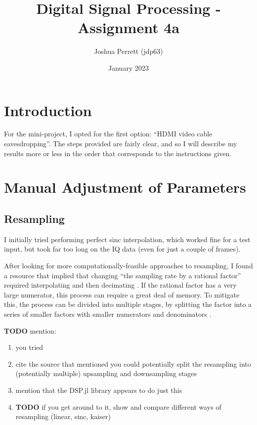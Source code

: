 \documentclass{article}
\title{Digital Signal Processing - Assignment 4a}
\author{Joshua Perrett (jdp63)}
\date{January 2023}
\begin{document}
\maketitle

\section*{Introduction}

For the mini-project, I opted for the first option: ``HDMI video cable eavesdropping''. The steps provided are fairly clear, and so I will describe my results more or less in the order that corresponds to the instructions given.

\section*{Manual Adjustment of Parameters}

\subsection*{Resampling}

I initially tried performing perfect sinc interpolation, which worked fine for a test input, but took far too long on the IQ data (even for just a couple of frames).


After looking for more computationally-feasible approaches to resampling, I found a resource that implied that changing ``the sampling rate by a rational factor'' required interpolating and then decimating \cite{dspguru-resampling}. If the rational factor has a very large numerator, this process can require a great deal of memory. To mitigate this, the process can be divided into multiple stages, by splitting the factor into a series of smaller factors with smaller numerators and denominators \cite{dspguru-resampling}.

\textbf{TODO} mention:
\begin{enumerate}
\item you tried
\item cite the source that mentioned you could potentially split the resampling into (potentially multiple) upsampling and downsampling stages
\item mention that the DSP.jl library appears to do just this
\item \textbf{TODO} if you get around to it, show and compare different ways of resampling (linear, sinc, kaiser)
\end{enumerate}
\end{document}
